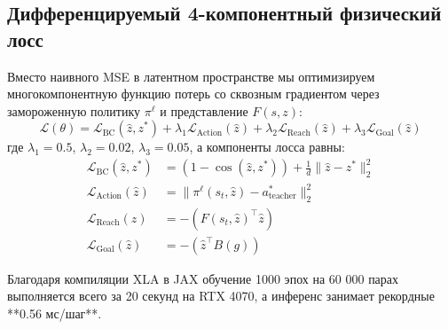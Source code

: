 \begin{table}[t]
\centering
\small
\caption{\textbf{Сравнительный анализ архитектур дистилляции} на датасете демонстраций учителя Дейкстры (\texttt{ogbench-antmaze-medium-navigate-v0}).}
\label{tab:distillation_comparison}
\end{table}

\subsection{Дифференцируемый 4-компонентный физический лосс}
Вместо наивного MSE в латентном пространстве мы оптимизируем многокомпонентную функцию потерь со сквозным градиентом через замороженную политику $\pi^\ell$ и представление $F(s, z)$:
\begin{equation}
    \mathcal{L}(\theta) = \mathcal{L}_{\text{BC}}(\hat{z}, z^*) + \lambda_1 \mathcal{L}_{\text{Action}}(\hat{z}) + \lambda_2 \mathcal{L}_{\text{Reach}}(\hat{z}) + \lambda_3 \mathcal{L}_{\text{Goal}}(\hat{z})
    \label{eq:distill_loss}
\end{equation}
где $\lambda_1 = 0.5$, $\lambda_2 = 0.02$, $\lambda_3 = 0.05$, а компоненты лосса равны:
\begin{align}
    \mathcal{L}_{\text{BC}}(\hat{z}, z^*) &= (1 - \cos(\hat{z}, z^*)) + \frac{1}{d}\|\hat{z} - z^*\|_2^2 \\
    \mathcal{L}_{\text{Action}}(\hat{z}) &= \|\pi^\ell(s_t, \hat{z}) - a^*_{\text{teacher}}\|_2^2 \\
    \mathcal{L}_{\text{Reach}}(\hat{z}) &= - \left(F(s_t, \hat{z})^\top \hat{z}\right) \\
    \mathcal{L}_{\text{Goal}}(\hat{z}) &= - \left(\hat{z}^\top B(g)\right)
\end{align}

Благодаря компиляции XLA в JAX обучение 1000 эпох на 60 000 парах выполняется всего за 20 секунд на RTX 4070, а инференс занимает рекордные **0.56 мс/шаг**.
